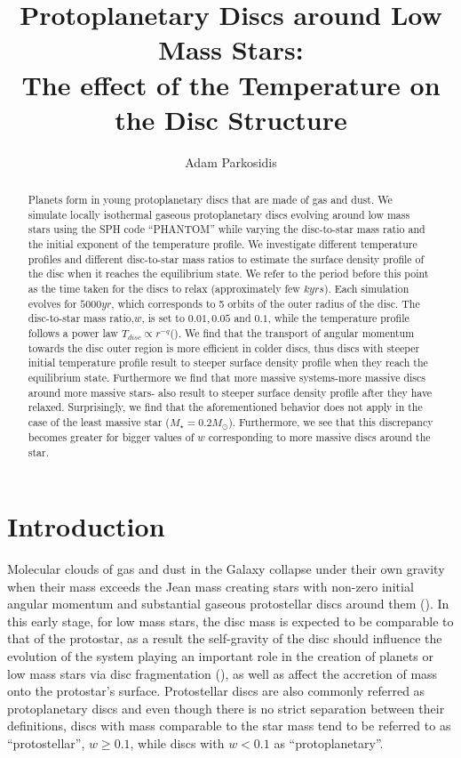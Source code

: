 \documentclass[aps,prb,twocolumn,superscriptaddress,floatfix,longbibliography]{revtex4-2}
\newcounter{para}
\newcommand{\mytitle}{Protoplanetary Discs around Low Mass Stars:\\ The effect of the Temperature on the Disc Structure}
\begin{document}
\title{\mytitle}

\author{Adam Parkosidis}


\begin{abstract}
Planets form in young protoplanetary discs that are made of gas and dust. We simulate locally isothermal gaseous protoplanetary discs evolving around low mass stars using the SPH code ``PHANTOM'' while varying the disc-to-star mass ratio and the initial exponent of the temperature profile. We investigate different temperature profiles and different disc-to-star mass ratios to estimate the surface density profile of the disc when it reaches the equilibrium state.  We refer to the period before this point as the time taken for the discs to relax (approximately few $kyrs$). Each simulation evolves for $5000yr$, which corresponds to 5 orbits of the outer radius of the disc. The disc-to-star mass ratio,$w$, is set to $0.01, 0.05$ and $0.1$, while the temperature profile follows a power law $T_{disc} \propto r^{-q}$(\cite{armitage2020astrophysics}). We find that the transport of angular momentum towards the disc outer region is more efficient in colder discs, thus discs with steeper initial temperature profile result to steeper surface density profile when they reach the equilibrium state. Furthermore we find that more massive systems-more massive discs around more massive stars- also result to steeper surface density profile after they have relaxed. Surprisingly, we find that the aforementioned behavior does not apply in the case of the least massive star ($M_{\star}=0.2M_{\odot}$). Furthermore, we see that this discrepancy becomes greater for bigger values of $w$ corresponding to more massive discs around the star. 
\end{abstract}
\maketitle


\section{Introduction}
Molecular clouds of gas and dust in the Galaxy collapse under their own gravity when their mass exceeds the Jean mass creating stars with non-zero initial angular momentum and substantial gaseous protostellar discs around them (\cite{shu1987star}). In this early stage, for low mass stars, the disc mass is expected to be comparable to that of the protostar, as a result the self-gravity of the disc should influence the evolution of the system playing an important role in the creation of planets or low mass stars via disc fragmentation (\cite{boss1997giant}), as well as affect the accretion of mass onto the protostar's surface. Protostellar discs are also commonly referred as protoplanetary discs and even though there is no strict separation between their definitions, discs  with mass comparable to the star mass tend to be referred to as ``protostellar'', $w \geq 0.1$, while discs with $w < 0.1$ as ``protoplanetary''.
\end{document}
